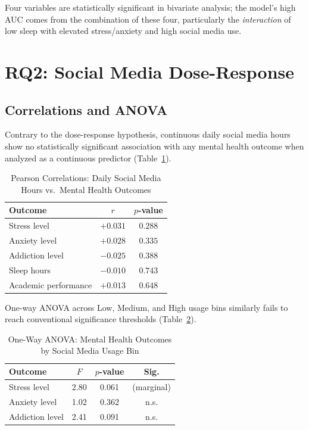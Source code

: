 \documentclass[11pt]{article}
\begin{document}
Four variables are statistically significant in bivariate analysis; the model's high AUC
comes from the combination of these four, particularly the \emph{interaction} of low sleep
with elevated stress/anxiety and high social media use.

\section{RQ2: Social Media Dose-Response}
\label{sec:rq2}

\subsection{Correlations and ANOVA}

Contrary to the dose-response hypothesis, continuous daily social media hours show no
statistically significant association with any mental health outcome when analyzed as a
continuous predictor (Table~\ref{tab:rq2_corr}).

\begin{table}[H]
\centering
\caption{Pearson Correlations: Daily Social Media Hours vs.\ Mental Health Outcomes}
\label{tab:rq2_corr}
\begin{tabular}{lcc}
\toprule
\textbf{Outcome} & $r$ & $p$-value \\
\midrule
Stress level         & $+0.031$ & $0.288$ \\
Anxiety level        & $+0.028$ & $0.335$ \\
Addiction level      & $-0.025$ & $0.388$ \\
Sleep hours          & $-0.010$ & $0.743$ \\
Academic performance & $+0.013$ & $0.648$ \\
\bottomrule
\end{tabular}
\end{table}

One-way ANOVA across Low, Medium, and High usage bins similarly fails to reach conventional
significance thresholds (Table~\ref{tab:rq2_anova}).

\begin{table}[H]
\centering
\caption{One-Way ANOVA: Mental Health Outcomes by Social Media Usage Bin}
\label{tab:rq2_anova}
\begin{tabular}{lccc}
\toprule
\textbf{Outcome} & $F$ & $p$-value & \textbf{Sig.} \\
\midrule
Stress level    & 2.80 & 0.061 & (marginal) \\
Anxiety level   & 1.02 & 0.362 & n.s. \\
Addiction level & 2.41 & 0.091 & n.s. \\
\bottomrule
\end{tabular}
\end{table}
\end{document}
